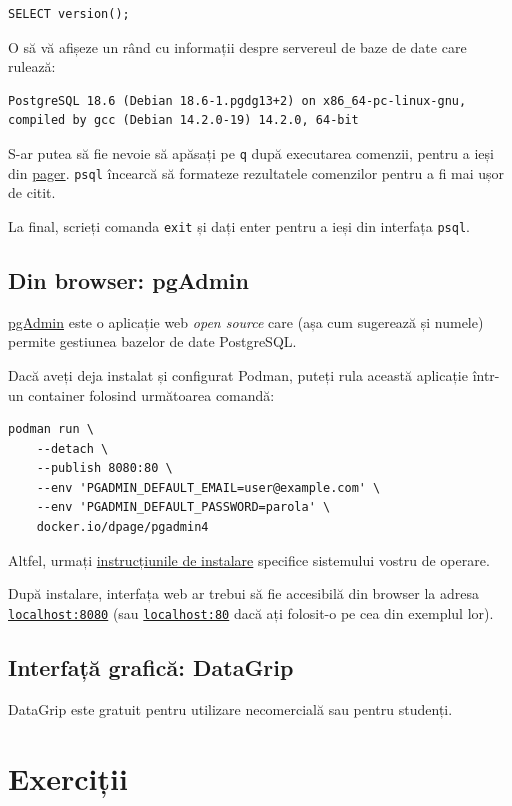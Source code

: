 \documentclass[a4paper, 12pt]{article}
\begin{document}
\begin{verbatim}
SELECT version();
\end{verbatim}

O să vă afișeze un rând cu informații despre servereul de baze de date care rulează:

\begin{verbatim}
PostgreSQL 18.6 (Debian 18.6-1.pgdg13+2) on x86_64-pc-linux-gnu,
compiled by gcc (Debian 14.2.0-19) 14.2.0, 64-bit
\end{verbatim}

S-ar putea să fie nevoie să apăsați pe \texttt{q} după executarea comenzii, pentru a ieși din \href{https://unix.stackexchange.com/questions/144016/what-is-a-pager}{pager}. \texttt{psql} încearcă să formateze rezultatele comenzilor pentru a fi mai ușor de citit.

La final, scrieți comanda \texttt{exit} și dați enter pentru a ieși din interfața \texttt{psql}.

\subsection{Din browser: pgAdmin}

\href{https://www.pgadmin.org/}{pgAdmin} este o aplicație web \textit{open source} care (așa cum sugerează și numele) permite gestiunea bazelor de date PostgreSQL.

Dacă aveți deja instalat și configurat Podman, puteți rula această aplicație într-un container folosind următoarea comandă:

\begin{verbatim}
podman run \
    --detach \
    --publish 8080:80 \
    --env 'PGADMIN_DEFAULT_EMAIL=user@example.com' \
    --env 'PGADMIN_DEFAULT_PASSWORD=parola' \
    docker.io/dpage/pgadmin4
\end{verbatim}

Altfel, urmați \href{https://www.pgadmin.org/download/}{instrucțiunile de instalare} specifice sistemului vostru de operare.

După instalare, interfața web ar trebui să fie accesibilă din browser la adresa \href{http://localhost:8080}{\texttt{localhost:8080}} (sau \href{http://localhost:80}{\texttt{localhost:80}} dacă ați folosit-o pe cea din exemplul lor).


\subsection{Interfață grafică: DataGrip}


DataGrip este gratuit pentru utilizare necomercială sau pentru studenți.


\section{Exerciții}

\end{document}
